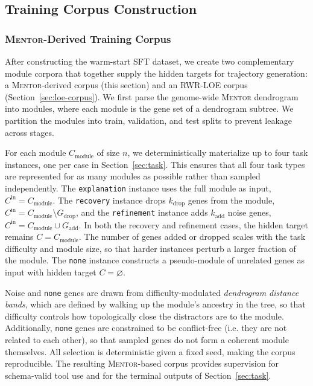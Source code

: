 \documentclass[thesis,letterpaper,12pt]{utthesis}
\begin{document}
\subsection{Training Corpus Construction}\label{sec:training-corpus}
\subsubsection{\textsc{Mentor}-Derived Training Corpus}\label{sec:mentor-corpus}After constructing the warm-start SFT dataset, we create two complementary module corpora that together supply the hidden targets for trajectory generation: a \textsc{Mentor}-derived corpus (this section) and an RWR-LOE corpus (Section~\ref{sec:loe-corpus}). We first parse the genome-wide \textsc{Mentor} dendrogram into modules, where each module is the gene set of a dendrogram subtree. We partition the modules into train, validation, and test splits to prevent leakage across stages.

For each module $C_{\text{module}}$ of size $n$, we deterministically materialize up to four task instances, one per case in Section~\ref{sec:task}. This ensures that all four task types are represented for as many modules as possible rather than sampled independently. The \texttt{explanation} instance uses the full module as input, $C^{\text{in}} = C_{\text{module}}$. The \texttt{recovery} instance drops $k_{\text{drop}}$ genes from the module, $C^{\text{in}} = C_{\text{module}} \setminus G_{\text{drop}}$, and the \texttt{refinement} instance adds $k_{\text{add}}$ noise genes, $C^{\text{in}} = C_{\text{module}} \cup G_{\text{add}}$. In both the recovery and refinement cases, the hidden target remains $C = C_{\text{module}}$. The number of genes added or dropped scales with the task difficulty and module size, so that harder instances perturb a larger fraction of the module. The \texttt{none} instance constructs a pseudo-module of unrelated genes as input with hidden target $C = \varnothing$.

Noise and \texttt{none} genes are drawn from difficulty-modulated \textit{dendrogram distance bands}, which are defined by walking up the module's ancestry in the tree, so that difficulty controls how topologically close the distractors are to the module. Additionally, \texttt{none} genes are constrained to be conflict-free (i.e. they are not related to each other), so that sampled genes do not form a coherent module themselves. All selection is deterministic given a fixed seed, making the corpus reproducible. The resulting \textsc{Mentor}-based corpus provides supervision for schema-valid tool use and for the terminal outputs of Section~\ref{sec:task}.
\end{document}
